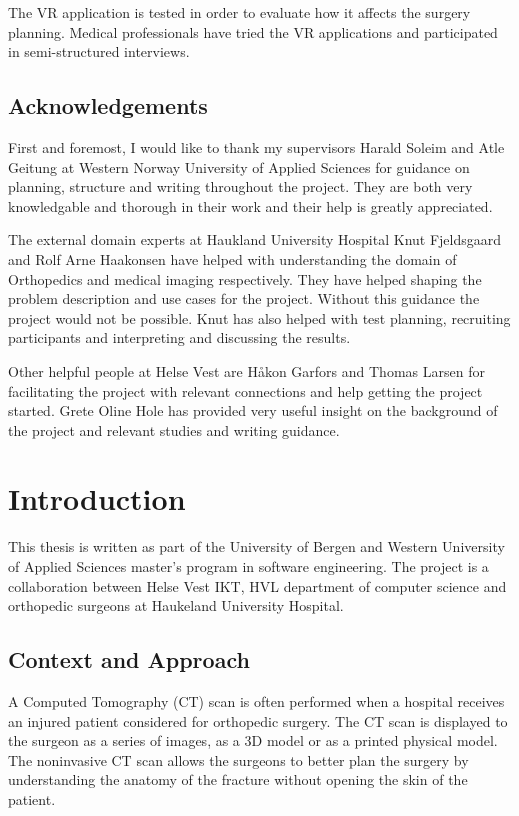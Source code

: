 \documentclass[a4paper]{report}
\begin{document}
The VR application is tested in order to evaluate how it affects the surgery planning.
Medical professionals have tried the VR applications and participated in semi-structured interviews.

\section*{Acknowledgements}
First and foremost, I would like to thank my supervisors Harald Soleim and Atle Geitung at Western Norway University of Applied Sciences for guidance on planning, structure and writing throughout the project. They are both very knowledgable and thorough in their work and their help is greatly appreciated.

The external domain experts at Haukland University Hospital Knut Fjeldsgaard and Rolf Arne Haakonsen have helped with understanding the domain of Orthopedics and medical imaging respectively. They have helped shaping the problem description and use cases for the project. Without this guidance the project would not be possible. Knut has also helped with test planning, recruiting participants and interpreting and discussing the results.

Other helpful people at Helse Vest are Håkon Garfors and Thomas Larsen for facilitating the project with relevant connections and help getting the project started. Grete Oline Hole has provided very useful insight on the background of the project and relevant studies and writing guidance.

\pagebreak
\tableofcontents
\listoffigures


\chapter{Introduction}
This thesis is written as part of the University of Bergen and Western University of Applied Sciences master's program in software engineering. The project is a collaboration between Helse Vest IKT, HVL department of computer science and orthopedic surgeons at Haukeland University Hospital.

\section{Context and Approach}
A Computed Tomography (CT) scan is often performed when a hospital receives an injured patient considered for orthopedic surgery. The CT scan is displayed to the surgeon as a series of images, as a 3D model or as a printed physical model. The noninvasive CT scan allows the surgeons to better plan the surgery by understanding the anatomy of the fracture without opening the skin of the patient.
\end{document}
